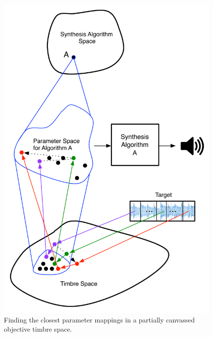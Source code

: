 \documentclass[a4paper,12pt]{report} 	%
\numberwithin{figure}{chapter}
\numberwithin{table}{chapter}
\numberwithin{equation}{chapter}
\begin{document}
\begin{flushleft}
\\
\begin{figure}[h!]
\begin{center}
\includegraphics[scale=0.75]{PucketteMetaSynthesis}
\caption[Mapping Timbre to Parameters]{Finding the closest parameter mappings in a partially canvassed objective timbre space.}
\end{center}
\end{figure}

\end{flushleft}
\end{document}
